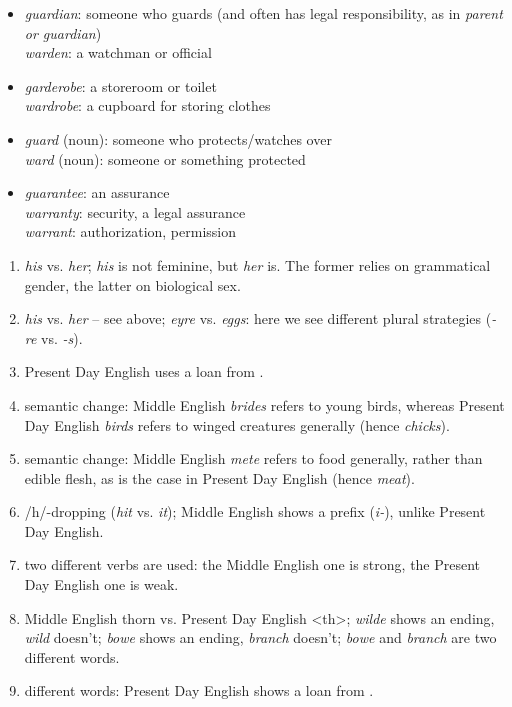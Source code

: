 \noindent\textbf{}
\begin{itemize}
    \item \textit{guardian}: someone who guards (and often has legal responsibility, as in \textit{parent or guardian})\\
    \textit{warden}: a watchman or official
    \item \textit{garderobe}: a storeroom or toilet\\
    \textit{wardrobe}: a cupboard for storing clothes
    \item \textit{guard} (noun): someone who protects/watches over\\
    \textit{ward} (noun): someone or something protected
    \item \textit{guarantee}: an assurance\\
    \textit{warranty}: security, a legal assurance\\
    \textit{warrant}: authorization, permission
\end{itemize}


\noindent\textbf{}
\begin{enumerate}
    \item \textit{his} vs. \textit{her}; \textit{his} is not feminine, but \textit{her} is. The former relies on grammatical gender, the latter on biological sex.
    \item \textit{his} vs. \textit{her} -- see above; \textit{eyre} vs. \textit{eggs}: here we see different plural strategies (\textit{-re} vs. \textit{-s}).
    \item Present Day English uses a loan from .
    \item semantic change: Middle English \textit{brides} refers to young birds, whereas Present Day English \textit{birds} refers to winged creatures generally (hence \textit{chicks}).
    \item semantic change: Middle English \textit{mete} refers to food generally, rather than edible flesh, as is the case in Present Day English (hence \textit{meat}).
    \item /h/-dropping (\textit{hit} vs. \textit{it}); Middle English shows a prefix (\textit{i-}), unlike Present Day English.
    \item two different verbs are used: the Middle English one is strong, the Present Day English one is weak.
    \item Middle English thorn vs. Present Day English <th>; \textit{wilde} shows an ending, \textit{wild} doesn't; \textit{bowe} shows an ending, \textit{branch} doesn't; \textit{bowe} and \textit{branch} are two different words.
    \item different words: Present Day English shows a loan from .
\end{enumerate}


